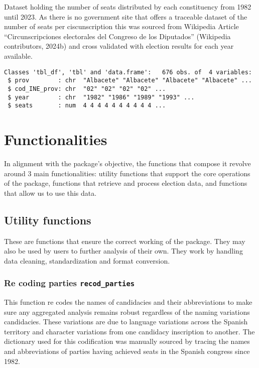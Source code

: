 \documentclass[
  letterpaper,
  DIV=11,
  numbers=noendperiod]{scrreprt}
\begin{document}
Dataset holding the number of seats distributed by each constituency
from 1982 until 2023. As there is no government site that offers a
traceable dataset of the number of seats per ciscunscription this was
sourced from Wikipedia Article ``Circunscripciones electorales del
Congreso de los Diputados'' (Wikipedia contributors, 2024b) and cross
validated with election results for each year available.

\begin{verbatim}
Classes 'tbl_df', 'tbl' and 'data.frame':   676 obs. of  4 variables:
 $ prov        : chr  "Albacete" "Albacete" "Albacete" "Albacete" ...
 $ cod_INE_prov: chr  "02" "02" "02" "02" ...
 $ year        : chr  "1982" "1986" "1989" "1993" ...
 $ seats       : num  4 4 4 4 4 4 4 4 4 4 ...
\end{verbatim}


\hypertarget{functionalities}{%
\chapter{Functionalities}\label{functionalities}}

In alignment with the package's objective, the functions that compose it
revolve around 3 main functionalities: utility functions that support
the core operations of the package, functions that retrieve and process
election data, and functions that allow us to use this data.

\hypertarget{utility-functions}{%
\section{Utility functions}\label{utility-functions}}

These are functions that ensure the correct working of the package. They
may also be used by users to further analysis of their own. They work by
handling data cleaning, standardization and format conversion.

\hypertarget{re-coding-parties-recod_parties}{%
\subsection{\texorpdfstring{Re coding parties
\texttt{recod\_parties}}{Re coding parties recod\_parties}}\label{re-coding-parties-recod_parties}}

This function re codes the names of candidacies and their abbreviations
to make sure any aggregated analysis remains robust regardless of the
naming variations candidacies. These variations are due to language
variations across the Spanish territory and character variations from
one candidacy inscription to another. The dictionary used for this
codification was manually sourced by tracing the names and abbreviations
of parties having achieved seats in the Spanish congress since 1982.
\end{document}
